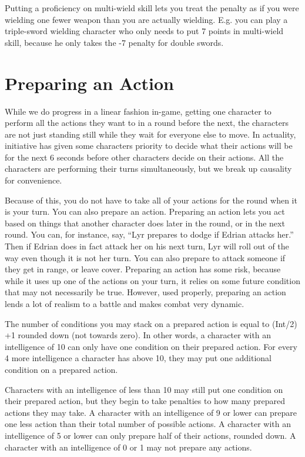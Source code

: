 Putting a proficiency on multi-wield skill lets you treat the penalty as if you were wielding one fewer weapon than you are actually wielding. E.g. you can play a triple-sword wielding character who only needs to put 7 points in multi-wield skill, because he only takes the -7 penalty for double swords.

\section{Preparing an Action}
While we do progress in a linear fashion in-game, getting one character to perform all the actions they want to in a round before the next, the characters are not just standing still while they wait for everyone else to move. In actuality, initiative has given some characters priority to decide what their actions will be for the next 6 seconds before other characters decide on their actions. All the characters are performing their turns simultaneously, but we break up causality for convenience.

Because of this, you do not have to take all of your actions for the round when it is your turn. You can also prepare an action. Preparing an action lets you act based on things that another character does later in the round, or in the next round. You can, for instance, say, “Lyr prepares to dodge if Edrian attacks her.” Then if Edrian does in fact attack her on his next turn, Lyr will roll out of the way even though it is not her turn. You can also prepare to attack someone if they get in range, or leave cover. Preparing an action has some risk, because while it uses up one of the actions on your turn, it relies on some future condition that may not necessarily be true. However, used properly, preparing an action lends a lot of realism to a battle and makes combat very dynamic.

The number of conditions you may stack on a prepared action is equal to (Int/2) +1 rounded down (not towards zero). In other words, a character with an intelligence of 10 can only have one condition on their prepared action. For every 4 more intelligence a character has above 10, they may put one additional condition on a prepared action.

Characters with an intelligence of less than 10 may still put one condition on their prepared action, but they begin to take penalties to how many prepared actions they may take. A character with an intelligence of 9 or lower can prepare one less action than their total number of possible actions. A character with an intelligence of 5 or lower can only prepare half of their actions, rounded down. A character with an intelligence of 0 or 1 may not prepare any actions.

